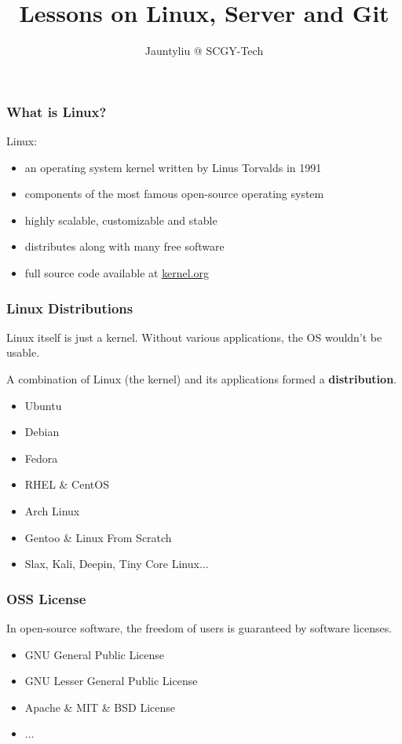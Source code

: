 \documentclass[11pt]{beamer}
\author{Jauntyliu @ SCGY-Tech}
\title{Lessons on Linux, Server and Git}
\begin{document}
\begin{frame}
\titlepage
\end{frame}


\begin{frame}
\frametitle{What is Linux?}

Linux:
\begin{itemize}
\item an operating system kernel written by Linus Torvalds in 1991
\item components of the most famous open-source operating system
\item highly scalable, customizable and stable
\item distributes along with many free software
\item full source code available at \href{http://www.kernel.org}{kernel.org}
\end{itemize}

\end{frame}



\begin{frame}
\frametitle{Linux Distributions}
Linux itself is just a kernel. Without various applications, the OS wouldn't be usable.

A combination of Linux (the kernel) and its applications formed a \textbf{distribution}.
\begin{itemize}
\item Ubuntu
\item Debian
\item Fedora
\item RHEL \& CentOS
\item Arch Linux
\item Gentoo \& Linux From Scratch
\item Slax, Kali, Deepin, Tiny Core Linux...
\end{itemize}
\end{frame}

\begin{frame}
\frametitle{OSS License}
In open-source software, the freedom of users is guaranteed by software licenses.
\begin{itemize}
\item GNU General Public License
\item GNU Lesser General Public License
\item Apache \& MIT \& BSD License
\item ...
\end{itemize}
\end{frame}
\end{document}
